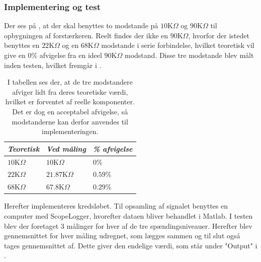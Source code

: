 \subsubsection{Implementering og test}
Der ses på , at der skal benyttes to modstande på $10$K$\Omega$ og $90$K$\Omega$ til opbygningen af forstærkeren. Reelt findes der ikke en $90$K$\Omega$, hvorfor der istedet benyttes en $22$K$\Omega$ og en $68$K$\Omega$ modstande i serie forbindelse, hvilket teoretisk vil give en $0$\% afvigelse fra en ideel $90$K$\Omega$ modstand. Disse tre modstande blev målt inden testen, hvilket fremgår i .
\begin{table}[H]
	\centering
	\begin{tabular}{|l|l|l|}
		\hline
		\textit{Teoretisk} & \textit{Ved måling} & \textit{\% afvigelse} \\ \hline
		$10$K$\Omega$       & $10$K$\Omega$        & $0$\%               \\ \hline
		$22$K$\Omega$      & $21.87$K$\Omega$     & $0.59$\%               \\ \hline
		$68$K$\Omega$      & $67.8$K$\Omega$       & $0.29$\%               \\ \hline
	\end{tabular}
	\caption{I tabellen ses der, at de tre modstandere afviger lidt fra deres teoretiske værdi, hvilket er forventet af reelle komponenter. Det er dog en acceptabel afvigelse, så modstanderne kan derfor anvendes til implementeringen.}
	\label{Tab:modstand_faktor18}
\end{table}

\noindent Herefter implementeres kredsløbet. Til opsamling af signalet benyttes en computer med ScopeLogger, hvorefter dataen bliver behandlet i Matlab. I testen blev der foretaget 3 målinger for hver af de tre spændingsniveauer. Herefter blev gennemsnittet for hver måling udregnet, som lægges sammen og til slut også tages gennemsnittet af. Dette giver den endelige værdi, som står under "Output" i .\


